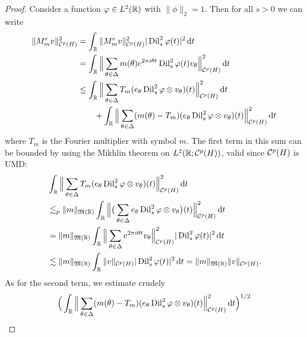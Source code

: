 \begin{proof}
 Consider a function $\varphi \in L^2(\mathbb{R})$ with $\|\phi\|_{2} = 1$.
 Then for all $s > 0$ we can write
 \begin{equation*}
   \begin{aligned}
     \| M_{m}^{e} v \|_{\mathcal{C}^{p}(H)}^{2}
     &= \int_{\mathbb{R}} \|M_{m}^{e} v \|_{\mathcal{C}^{p}(H)}^{2} |\operatorname{Dil}^{2}_{s} \varphi(t)|^{2} \, \mathrm{d} t \\
     &= \int_{\mathbb{R}} \Big\| \sum_{\theta \in \Delta} m(\theta) e^{2\pi i \theta t} \operatorname{Dil}_{s}^{2} \varphi(t) v_{\theta} \Big\|_{\mathcal{C}^{p}(H)}^{2} \, \mathrm{d} t \\
     &\leq \int_{\mathbb{R}} \Big\| \sum_{\theta \in \Delta} T_{m} (e_{\theta} \operatorname{Dil}_{s}^{2} \varphi \otimes v_{\theta})(t) \Big\|_{\mathcal{C}^{p}(H)}^{2}  \, \mathrm{d} t \\
     &\qquad + \int_{\mathbb{R}} \Big\| \sum_{\theta \in \Delta} (m(\theta) - T_{m}) (e_{\theta} \operatorname{Dil}_{s}^{2} \varphi \otimes v_{\theta})(t) \Big\|_{\mathcal{C}^{p}(H)}^{2}  \, \mathrm{d} t
   \end{aligned}
 \end{equation*}
  where $T_{m}$ is the Fourier multiplier with symbol $m$.
  The first term in this sum can be bounded by using the Mikhlin theorem on $L^2(\mathbb{R};\mathcal{C}^{p}(H))$, valid since $\mathcal{C}^{p}(H)$ is UMD:
  \begin{equation*}
    \begin{aligned}
      &\int_{\mathbb{R}} \Big\| \sum_{\theta \in \Delta} T_{m} (e_{\theta} \operatorname{Dil}_{s}^{2} \varphi \otimes v_{\theta})(t) \Big\|_{\mathcal{C}^{p}(H)}^{2}  \, \mathrm{d} t \\
      &\lesssim_{p} \|m\|_{\mathfrak{M}(\mathbb{R})} \int_{\mathbb{R}} \Big\| \big( \sum_{\theta \in \Delta} e_{\theta} \operatorname{Dil}_{s}^{2} \varphi \otimes v_{\theta} \big)(t) \Big\|_{\mathcal{C}^{p}(H)}^{2}  \, \mathrm{d} t \\
      &= \|m\|_{\mathfrak{M}(\mathbb{R})} \int_{\mathbb{R}} \Big\| \sum_{\theta \in \Delta} e^{2\pi i \theta t}  v_{\theta} \Big\|_{\mathcal{C}^{p}(H)}^{2} |\operatorname{Dil}_{s}^{2} \varphi(t)|^{2} \, \mathrm{d} t \\
      &\lesssim \|m\|_{\mathfrak{M}(\mathbb{R})} \int_{\mathbb{R}} \|v\|_{\mathcal{C}^{p}(H)} |\operatorname{Dil}_{s}^{2} \varphi(t)|^{2} \, \mathrm{d} t
      = \|m\|_{\mathfrak{M}(\mathbb{R})} \|v\|_{\mathcal{C}^{p}(H)}.
    \end{aligned}
  \end{equation*} 
  As for the second term, we estimate crudely
  \begin{equation*}
    \begin{aligned}
      &\Big(\int_{\R} \Big\| \sum_{\theta \in \Delta} (m(\theta) - T_{m}) (e_{\theta} \Dil_{s}^{2} \phi \otimes v_{\theta})(t) \Big\|_{\mc{C}^{p}(H)}^{2}  \, \dd t \Big)^{1/2} \\

\end{aligned}
\end{equation*}
\end{proof}
